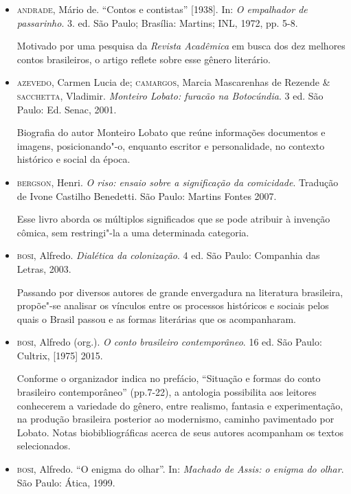 \documentclass[11pt]{extarticle}
\begin{document}
\begin{itemize}

\item  \textsc{andrade}, Mário de. ``Contos e contistas'' {[}1938{]}. In: \emph{O
empalhador de passarinho}. 3. ed. São Paulo; Brasília: Martins; INL,
1972, pp. 5-8. 

Motivado por uma pesquisa da \emph{Revista Acadêmica} em
busca dos dez melhores contos brasileiros, o artigo reflete sobre esse
gênero literário.

\item  \textsc{azevedo}, Carmen Lucia de; \textsc{camargos}, Marcia Mascarenhas de Rezende \&
\textsc{sacchetta}, Vladimir. \emph{Monteiro Lobato: furacão na Botocúndia}. 3
ed. São Paulo: Ed. Senac, 2001.

Biografia do autor Monteiro Lobato que reúne informações documentos e imagens, 
posicionando"-o, enquanto escritor e personalidade, no contexto histórico e 
social da época. 

\item  \textsc{bergson}, Henri. \emph{O riso: ensaio sobre a significação da
comicidade}. Tradução de Ivone Castilho Benedetti. São Paulo: Martins
Fontes 2007.

Esse livro aborda os múltiplos significados que se pode atribuir à invenção cômica, 
sem restringi"-la a uma determinada categoria. 

\item  \textsc{bosi}, Alfredo. \emph{Dialética da colonização}. 4 ed. São Paulo:
Companhia das Letras, 2003.

Passando por diversos autores de grande envergadura na literatura brasileira, 
propõe"-se analisar os vínculos entre os processos históricos e sociais pelos 
quais o Brasil passou e as formas literárias que os acompanharam. 

\item  \textsc{bosi}, Alfredo (org.). \emph{O conto brasileiro contemporâneo}. 16 ed.
São Paulo: Cultrix, {[}1975{]} 2015. 

Conforme o organizador indica no prefácio, ``Situação e formas do conto brasileiro 
contemporâneo'' (pp.7-22), a antologia possibilita aos leitores conhecerem a 
variedade do gênero, entre realismo, fantasia e experimentação, na produção
brasileira posterior ao modernismo, caminho pavimentado por Lobato.
Notas biobibliográficas acerca de seus autores acompanham os textos
selecionados.

\item  \textsc{bosi}, Alfredo. ``O enigma do olhar''. In: \emph{Machado de Assis: o
enigma do olhar}. São Paulo: Ática, 1999.


\end{itemize}
\end{document}
